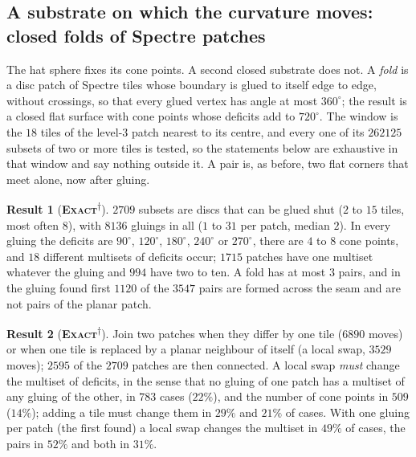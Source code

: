 \documentclass[11pt]{article}
\newcommand{\exact}{\textbf{\textsc{Exact}}}
\newcommand{\snap}{\textsuperscript{$\dagger$}}      %
\theoremstyle{definition}
\newtheorem{result}{Result}
\begin{document}
\subsection{A substrate on which the curvature moves: closed folds of Spectre patches}\label{sec:folds}
The hat sphere fixes its cone points. A second closed substrate does not. A \emph{fold} is a disc patch of Spectre tiles whose boundary is glued to itself edge to edge, without crossings, so that every glued vertex has angle at most $360^\circ$; the result is a closed flat surface with cone points whose deficits add to $720^\circ$. The window is the $18$ tiles of the level-$3$ patch nearest to its centre, and every one of its $262125$ subsets of two or more tiles is tested, so the statements below are exhaustive in that window and say nothing outside it. A pair is, as before, two flat corners that meet alone, now after gluing.
\begin{result}[\exact\snap]\label{res:folds}
$2709$ subsets are discs that can be glued shut ($2$ to $15$ tiles, most often $8$), with $8136$ gluings in all ($1$ to $31$ per patch, median $2$). In every gluing the deficits are $90^\circ$, $120^\circ$, $180^\circ$, $240^\circ$ or $270^\circ$, there are $4$ to $8$ cone points, and $18$ different multisets of deficits occur; $1715$ patches have one multiset whatever the gluing and $994$ have two to ten. A fold has at most $3$ pairs, and in the gluing found first $1120$ of the $3547$ pairs are formed across the seam and are not pairs of the planar patch.
\end{result}
\begin{result}[\exact\snap]\label{res:folds-moves}
Join two patches when they differ by one tile ($6890$ moves) or when one tile is replaced by a planar neighbour of itself (a local swap, $3529$ moves); $2595$ of the $2709$ patches are then connected. A local swap \emph{must} change the multiset of deficits, in the sense that no gluing of one patch has a multiset of any gluing of the other, in $783$ cases ($22\%$), and the number of cone points in $509$ ($14\%$); adding a tile must change them in $29\%$ and $21\%$ of cases. With one gluing per patch (the first found) a local swap changes the multiset in $49\%$ of cases, the pairs in $52\%$ and both in $31\%$.
\end{result}
\end{document}
